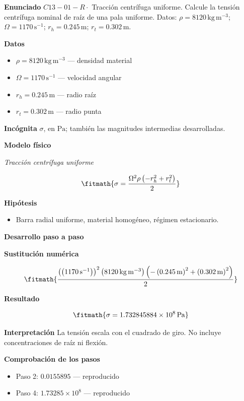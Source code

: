 \documentclass[10pt,openany]{book}
\begin{document}
\begin{tcolorbox}[title={Problema resuelto 1}, studiumworked, breakable]

\noindent\textbf{Enunciado}
\(C13-01-R \cdot\) Tracción centrífuga uniforme. Calcule la tensión centrífuga nominal de raíz de una pala uniforme. Datos: \(\rho=8120\, \mathrm{kg}\,\mathrm{m}^{-3}\); \(\Omega=1170\, \mathrm{s}^{-1}\); \(r_h=0.245\, \mathrm{m}\); \(r_t=0.302\, \mathrm{m}\).

\noindent\textbf{Datos}
\begin{itemize}
\item $\rho = 8120\,\mathrm{kg}\,\mathrm{m}^{-3}$ — densidad material
\item $\Omega = 1170\,\mathrm{s}^{-1}$ — velocidad angular
\item $r_h = 0.245\,\mathrm{m}$ — radio raíz
\item $r_t = 0.302\,\mathrm{m}$ — radio punta
\end{itemize}

\noindent\textbf{Incógnita}
$\sigma$, en $\mathrm{Pa}$; también las magnitudes intermedias desarrolladas.

\noindent\textbf{Modelo físico}

\noindent\textit{Tracción centrífuga uniforme}

\[
\fitmath{\sigma=\frac{\Omega^{2} \rho \left(- r_h^{2} + r_t^{2}\right)}{2}}
\]

\noindent\textbf{Hipótesis}
\begin{itemize}
\item Barra radial uniforme, material homogéneo, régimen estacionario.
\end{itemize}

\noindent\textbf{Desarrollo paso a paso}



\noindent\textbf{Sustitución numérica}

\[
\fitmath{\frac{\left(\left(1170\,\mathrm{s}^{-1}\right)\right)^{2} \left(8120\,\mathrm{kg}\,\mathrm{m}^{-3}\right) \left(- \left(0.245\,\mathrm{m}\right)^{2} + \left(0.302\,\mathrm{m}\right)^{2}\right)}{2}}
\]

\noindent\textbf{Resultado}

\[
\fitmath{\sigma=1.732845884\times10^{8}\,\mathrm{Pa}}
\]

\noindent\textbf{Interpretación}
La tensión escala con el cuadrado de giro. No incluye concentraciones de raíz ni flexión.

\noindent\textbf{Comprobación de los pasos}
\begin{itemize}
\item Paso 2: $0.0155895$ — reproducido
\item Paso 4: $1.73285\times 10^{8}$ — reproducido
\end{itemize}


\end{tcolorbox}
\end{document}
